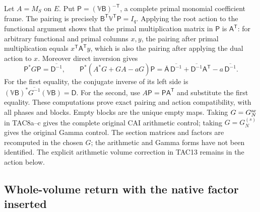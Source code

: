 Let $A=M_S$ on $E$. Put $\mathsf P=(\mathbb V\mathsf B)^{-\mathsf T}$, a complete
primal monomial coefficient frame. The pairing is precisely
$\mathsf B^{\mathsf T}\mathbb V^{\mathsf T}\mathsf P=I_q$.
Applying the root action to the functional argument shows that the
primal multiplication matrix in $\mathsf P$ is $\mathsf A^{\mathsf T}$:
for arbitrary functional and primal columns $x,y$, the pairing after
primal multiplication equals $x^{\mathsf T}\mathsf A^{\mathsf T}y$,
which is also the pairing after applying the dual action to $x$.
Moreover direct inversion gives
\[
 \mathsf P^*G\mathsf P=\overline{\mathsf D^{-1}},\qquad
 \mathsf P^*(A^*G+GA-aG)\mathsf P
   =\overline{\mathsf A}\,\overline{\mathsf D^{-1}}
      +\overline{\mathsf D^{-1}}\mathsf A^{\mathsf T}
      -a\,\overline{\mathsf D^{-1}}.
 \tag{TAC8c}
\]
For the first equality, the conjugate inverse of its left side is
$(\mathbb V\mathsf B)^*\overline{G^{-1}}(\mathbb V\mathsf B)
=\mathsf D$. For the second, use $A\mathsf P=\mathsf P\mathsf A^{\mathsf T}$
and substitute the first equality. These computations prove exact
pairing and action compatibility, with all phases and blocks.
Empty blocks are the unique empty maps. Taking $G=G_N^{\rm ar}$
in TAC8a--c gives the complete original CAI arithmetic control;
taking $G=G_N^{(s)}$ gives the original Gamma control. The section
matrices and factors are recomputed in the chosen $G$; the arithmetic
and Gamma forms have not been identified. The explicit arithmetic
volume correction in TAC13 remains in the action below.

\subsection{Whole-volume return with the native factor inserted}

